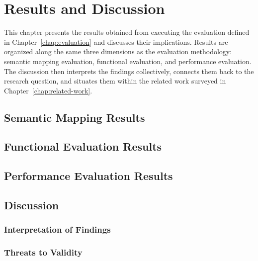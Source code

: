 \chapter{Results and Discussion}
\label{chap:results}

This chapter presents the results obtained from executing the evaluation defined in
    Chapter~\ref{chap:evaluation} and discusses their implications.
Results are organized along the same three dimensions as the evaluation methodology:
    semantic mapping evaluation,
    functional evaluation, and
    performance evaluation.
The discussion then interprets the findings collectively,
    connects them back to the research question,
    and situates them within the related work surveyed in Chapter~\ref{chap:related-work}.

\section{Semantic Mapping Results}
\label{sec:semantic-mapping-results}

\section{Functional Evaluation Results}
\label{sec:functional-results}

\section{Performance Evaluation Results}
\label{sec:performance-results}

\section{Discussion}
\label{sec:discussion}

\subsection{Interpretation of Findings}
\label{subsec:interpretation}

\subsection{Threats to Validity}
\label{subsec:threats-to-validity}
